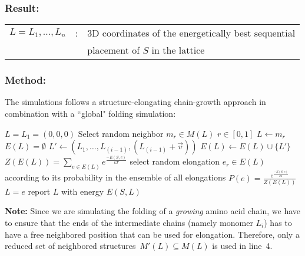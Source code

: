 \documentclass{article}
\begin{document}
\subsubsection*{Result:}

\begin{tabular}{rcl}
	$L=L_1,\ldots,L_n$	&:& 3D coordinates of the energetically best sequential \\
						&& placement of $S$ in the lattice
\end{tabular}

\subsubsection*{Method:}

The simulations follows a structure-elongating chain-growth approach in
combination with a ``global" folding simulation:

\vspace{0.5em}
\begin{algorithmic}[1]
	\State $L=L_1=(0,0,0)$ 
		\Statex
			\State Select random neighbor $m_r \in M(L)$
			\State $r \in [0,1]$ 
				\State $L \gets m_r$ 
			\Else {}
			\EndIf
		\EndFor
		\Statex
		\State $E(L) = \emptyset$ 
				\State $L' \gets (L_1,\ldots,L_{(i-1)},(L_{(i-1)} + \vec v))$
				\State $E(L) \gets E(L) \cup \{L'\}$
			\EndIf
		\EndFor
		\State $Z(E(L)) = \sum_{e\in E(L)} e^{\frac{-E(S,e)}{kT}}$ 
		\Statex
		\State select random elongation $e_r\in E(L)$ according to its probability  
		\Statex \hspace{2em} in the ensemble of all elongations
		$P(e) = \frac{e^{\frac{-E(S,e)}{kT}}}{Z(E(L))}$ 
		\Statex
		\State $L = e$ 
	\EndFor
	\State report $L$ with energy $E(S,L)$
\end{algorithmic}


\vspace{1em}
{\bfseries Note:} Since we are simulating the folding of a \emph{growing} amino
acid chain, we have to ensure that the ends of the intermediate chains (namely
monomer $L_i$) has to have a free neighbored position that can be used for
elongation. Therefore, only a reduced set of neighbored
structures~$M'(L)\subseteq M(L)$ is used in line~4.
\end{document}
